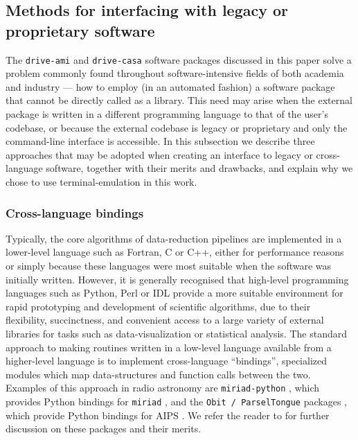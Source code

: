 \documentclass[5p,authoryear]{elsarticle}
\begin{document}
\subsection{Methods for interfacing with legacy or proprietary software}
\label{sec:software}
The \texttt{drive-ami} and \texttt{drive-casa} software packages discussed in this paper solve a problem commonly found throughout software-intensive fields of both academia and industry --- how to employ (in an automated fashion) a software package that cannot be directly called as a library. This need may arise when the external package is written in a different programming language to that of the user's codebase, or because the external codebase is legacy or proprietary and only the command-line interface is accessible.
In this subsection we describe three approaches that may be adopted when creating an interface to legacy or cross-language software, together with their merits and drawbacks, and explain why we chose to use terminal-emulation in this work.

\subsubsection{Cross-language bindings}
Typically, the core algorithms of data-reduction pipelines are 
implemented in a lower-level language such as Fortran, C or C++, either for 
performance reasons or simply because these languages were most suitable
when the software was initially written. However, it is generally recognised
that high-level programming languages such as Python, Perl or IDL provide a more
suitable environment for rapid prototyping and development of scientific 
algorithms, due to their flexibility, succinctness, and 
convenient access to a large variety of external libraries for tasks such
as data-visualization or statistical analysis.
The standard approach to making routines written in a low-level language 
available from a higher-level language is to 
implement cross-language ``bindings'', 
specialized modules which map data-structures and function calls between the two.
Examples of this approach in radio 
astronomy are \texttt{miriad-python} \citep{Williams2012}, which provides 
Python bindings for \texttt{miriad} \citep{Sault1995,Sault2011},
and the \texttt{Obit / ParselTongue} packages 
\citep{Cotton2008,Cotton2013,Kettenis2006, Kettenis2012}, which provide 
Python bindings for AIPS \citep{Fomalont1981}. 
We refer the reader to \cite{Williams2012} for further discussion on these
packages and their merits.
\end{document}

